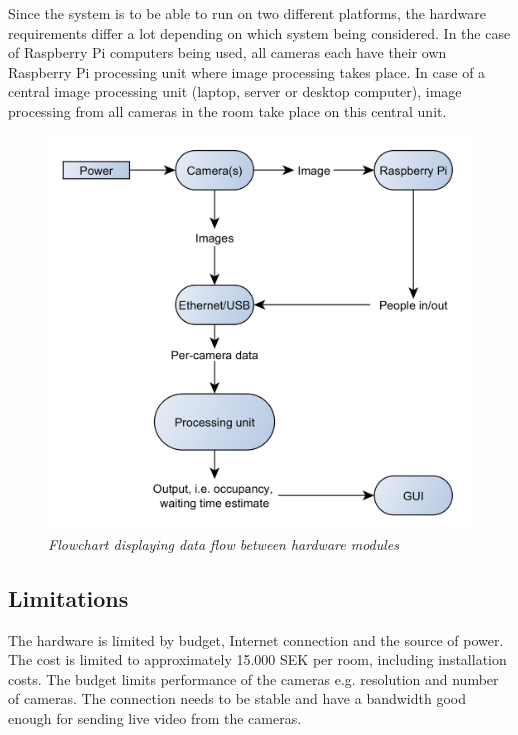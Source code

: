 
Since the system is to be able to run on two different platforms, the hardware requirements differ a lot depending on which system being considered. In the case of Raspberry Pi computers being used, all cameras each have their own Raspberry Pi processing unit where image processing takes place. In case of a central image processing unit (laptop, server or desktop computer), image processing from all cameras in the room take place on this central unit.


\begin{figure}[htb]
	\centering
	\includegraphics[width=160mm]{images/Hardware.png}
	\caption{\textit{Flowchart displaying data flow between hardware modules}}
	\label{fig:block_overview_fig}  %
\end{figure}
\newpage

\subsection{Limitations}
The hardware is limited by budget, Internet connection and the source of power. The cost is limited to approximately 15.000 SEK per room, including installation costs. The budget limits performance of the cameras e.g. resolution and number of cameras. The connection needs to be stable and have a bandwidth good enough for sending live video from the cameras.   
\newpage
